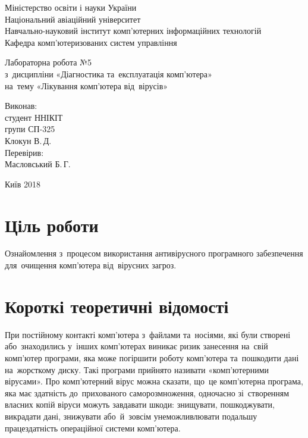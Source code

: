 \documentclass[
	a4paper,
	oneside,
	DIV = 12,
	fontsize = 13pt,
	headings = normal,
]{scrartcl}
\newlength{\gridunitwidth}
\newcommand{\allcaps}[1]{{\addfontfeatures{LetterSpace = 5}#1}}
\begin{document}
\setlength{\gridunitwidth}{\textwidth / 12}
	\begin{titlepage}
		\begin{center}
			Міністерство освіти і науки України\\
			Національний авіаційний університет\\
			Навчально-науковий інститут комп'ютерних інформаційних технологій\\
			Кафедра комп'ютеризованих систем управління

			\vspace{\fill}
				Лабораторна робота №5\\
				з~дисципліни «Діагностика та~експлуатація комп'ютера»\\
				на~тему «Лікування комп'ютера від~вірусів»\\

			\vspace{\fill}

			\begin{flushright}
				Виконав:\\
				студент \allcaps{ННІКІТ}\\
				групи СП-325\\
				Клокун В.\,Д.\\
				Перевірив:\\
				Масловський Б.\,Г.
			\end{flushright}

			Київ 2018
		\end{center}
	\end{titlepage}

	\section{Ціль роботи}
		Ознайомлення з~процесом використання антивірусного програмного забезпечення для~очищення комп'ютера від~вірусних загроз.

	\section{Короткі теоретичні відомості}
		При постійному контакті комп’ютера з~файлами та~носіями, які були створені або~знаходились у~інших комп’ютерах виникає ризик занесення на~свій комп’ютер програми, яка може погіршити роботу комп’ютера та~пошкодити дані на~жорсткому диску. Такі програми прийнято називати «комп’ютерними вірусами». Про комп’ютерний вірус можна сказати, що~це комп'ютерна програма, яка має здатність до~прихованого саморозмноження, одночасно зі~створенням власних копій віруси можуть завдавати шкоди: знищувати, пошкоджувати, викрадати дані, знижувати або~й~зовсім унеможливлювати подальшу працездатність операційної системи комп'ютера. 
\end{document}

